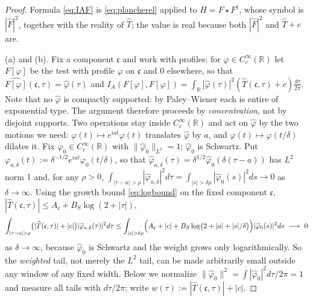\documentclass[11pt]{amsart}
\theoremstyle{definition}
\theoremstyle{remark}
\newcommand{\R}{\mathbb R}
\newcommand{\Th}{\widehat{T}}
\begin{document}
\begin{proof}
Formula \eqref{eq:IAF} is \eqref{eq:plancherel} applied to $H=F\star
F^{\dagger}$, whose symbol is $|\widehat F|^{2}$, together with the reality of
$\Th$; the value is real because both $|\widehat F|^{2}$ and $\Th+c$ are.

(a) and (b).  Fix a component $\mathfrak c$ and work with profiles: for
$\varphi\in C_c^{\infty}(\R)$ let $F[\varphi]$ be the test with profile
$\varphi$ on $\mathfrak c$ and $0$ elsewhere, so that
$\widehat{F[\varphi]}(\mathfrak c,\tau)=\widehat\varphi(\tau)$ and
$I_A(F[\varphi],F[\varphi])=\int_{\R}|\widehat\varphi(\tau)|^{2}
(\Th(\mathfrak c,\tau)+c)\frac{d\tau}{2\pi}$.  Note that no $\widehat\varphi$
is compactly supported: by Paley--Wiener each is entire of exponential type.
The argument therefore proceeds by \emph{concentration}, not by disjoint
supports.  Two operations stay inside $C_c^{\infty}(\R)$ and act on
$\widehat\varphi$ by the two motions we need: $\varphi(t)\mapsto
e^{iat}\varphi(t)$ translates $\widehat\varphi$ by $a$, and
$\varphi(t)\mapsto\varphi(t/\delta)$ dilates it.  Fix $\varphi_0\in
C_c^{\infty}(\R)$ with $\lVert\widehat\varphi_0\rVert_{L^{2}}=1$;
$\widehat\varphi_0$ is Schwartz.  Put
$\varphi_{a,\delta}(t):=\delta^{-1/2}e^{iat}\varphi_0(t/\delta)$, so that
$\widehat\varphi_{a,\delta}(\tau)=\delta^{1/2}\widehat\varphi_0(\delta(\tau-a))$
has $L^{2}$ norm $1$ and, for any $\rho>0$,
$\int_{|\tau-a|>\rho}|\widehat\varphi_{a,\delta}|^{2}d\tau=
\int_{|s|>\delta\rho}|\widehat\varphi_0(s)|^{2}ds\to0$ as $\delta\to\infty$.
Using the growth bound \eqref{eq:logbound} on the fixed component
$\mathfrak c$, $|\Th(\mathfrak c,\tau)|\le A_{\mathfrak c}+B_S\log(2+|\tau|)$,
\begin{equation}\label{eq:weightedtail}
\int_{|\tau-a|>\rho}\bigl(|\Th(\mathfrak c,\tau)|+|c|\bigr)
|\widehat\varphi_{a,\delta}(\tau)|^{2}d\tau
\le\int_{|s|>\delta\rho}\Bigl(A_{\mathfrak c}+|c|+B_S\log\bigl(2+|a|+|s|/\delta\bigr)\Bigr)
|\widehat\varphi_0(s)|^{2}ds\ \longrightarrow\ 0
\end{equation}
as $\delta\to\infty$, because $\widehat\varphi_0$ is Schwartz and the weight
grows only logarithmically.  So the \emph{weighted} tail, not merely the
$L^{2}$ tail, can be made arbitrarily small outside any window of any fixed
width.  Below we normalize $\lVert\widehat\varphi_0\rVert^{2}=
\int|\widehat\varphi_0|^{2}d\tau/2\pi=1$ and measure all tails with
$d\tau/2\pi$; write $w(\tau):=|\Th(\mathfrak c,\tau)|+|c|$.


\end{proof}
\end{document}
